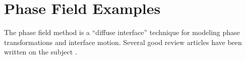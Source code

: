 \documentclass[letterpaper,twoside,openright,10pt]{memoir}
\begin{document}

% 

% 
% 

\chapter{Phase Field Examples}


The phase field method is a ``diffuse interface'' technique for
modeling phase transformations and interface motion. Several good
review articles have been written on the subject
\cite{BoettingerReview:2002,ChenReview:2002,McFaddenReview:2002}.






\label{sec:anisotropy}


\label{sec:impingement}
% 
% 
% 
% 


% 

% 
% 
% 
% 
\end{document}
